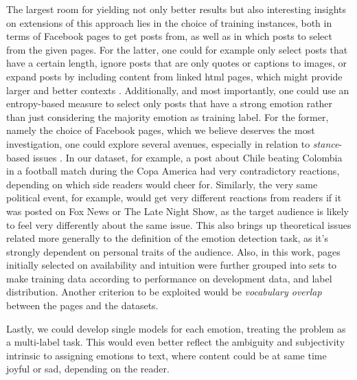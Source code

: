 \documentclass[11pt]{article}
\begin{document}
The largest room for yielding not only better results but also interesting insights on extensions of this approach lies in the choice of training instances, both in terms of Facebook pages to get posts from, as well as in which posts to select from the given pages. 
For the latter, one could for example only select posts that have a certain length, ignore posts that are only quotes or captions to images, or expand posts by including content from linked html pages, which might provide larger and better contexts \cite{plank:2014}. Additionally, and most importantly, one could use an entropy-based measure to select only posts that have a strong emotion rather than just considering the majority emotion as training label. For the former, namely the choice of Facebook pages, which we believe deserves the most investigation, one could explore several avenues, especially in relation to \textit{stance}-based issues \cite{stance}. In our dataset, for example, a post about Chile beating Colombia in a football match during the Copa America had very contradictory reactions, depending on which side readers would cheer for. Similarly, the very same political event, for example, would get very different reactions from readers if it was posted on Fox News or The Late Night Show, as the target audience is likely to feel very differently about the same issue. This also brings up theoretical issues related more generally to the definition of the emotion detection task, as it's strongly dependent on personal traits of the audience.
Also, in this work, pages initially selected on availability and intuition were further grouped into sets to make training data according to performance on development data, and label distribution. Another criterion to be exploited would be \textit{vocabulary overlap} between the pages and the datasets.

Lastly, we could develop single models for each emotion, treating the problem as a multi-label task. This would even better reflect the ambiguity  and subjectivity intrinsic to assigning emotions to text, where content could be at same time joyful or sad, depending on the reader.






%


\end{document}
